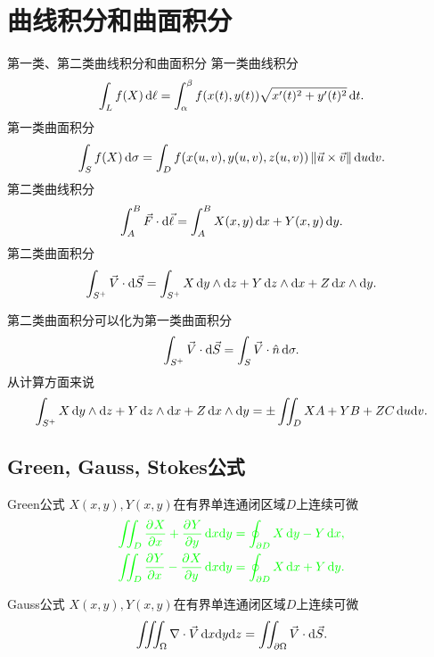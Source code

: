 \chapter{曲线积分和曲面积分}
\begin{definition}{第一类、第二类曲线积分和曲面积分}{}
	第一类曲线积分
	\[
		\int_Lf(X)\d\ell=\int_\alpha^\beta f(x(t),y(t))\sqrt{x'(t)^2+y'(t)^2}\d t.
	\]
	第一类曲面积分
	\[
		\int_Sf(X)\d\sigma=\int_Df(x(u,v),y(u,v),z(u,v))\norm{\vec u\times\vec v}\d u\nd v.
	\]
	第二类曲线积分
	\[
		\int_A^B\vec F\cdot\d\vec\ell=\int_A^B X(x,y)\d x+Y(x,y)\d y.
	\]
	第二类曲面积分
	\[
		\int_{S^+}\vec V\cdot\d\vec S=\int_{S^+}X\d y\wedge\d z+Y\d z\wedge\d x+Z\d x\wedge\d y.
	\]
\end{definition}
第二类曲面积分可以化为第一类曲面积分
\[
	\int_{S^+}\vec V\cdot\d\vec S=\int_S\vec V\cdot\hat n\d\sigma.
\]
从计算方面来说
\[
	\int_{S^+}X\d y\wedge\d z+Y\d z\wedge\d x+Z\d x\wedge\d y=\pm\iint_DXA+YB+ZC\d u\nd v.
\]
\section{Green, Gauss, Stokes公式}
\begin{theorem}{Green公式}{}
	$X(x,y),Y(x,y)$在有界单连通闭区域$D$上连续可微
	\begin{align*}
		\color{green}\iint_D\pv Xx+\pv Yy\d x\nd y=\oint_{\p D}X\d y-Y\d x, \\
		\color{green}\iint_D\pv Yx-\pv Xy\d x\nd y=\oint_{\p D}X\d x+Y\d y.
	\end{align*}
\end{theorem}
\begin{theorem}{Gauss公式}{}
	$X(x,y),Y(x,y)$在有界单连通闭区域$D$上连续可微
	\begin{align*}
		\iiint_\Omega\nabla\cdot\vec V\d x\nd y\nd z=\iint_{\p\Omega}\vec V\cdot\d\vec S.
	\end{align*}
\end{theorem}
